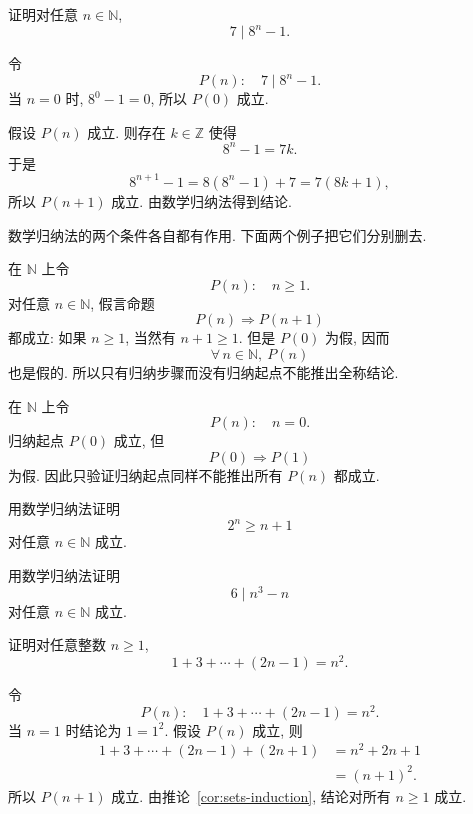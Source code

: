 \documentclass[usesamecnt, thmcnt=section, lang=cn, newtx, 10pt, scheme=chinese]{elegantbook}
\begin{document}
\begin{example}
证明对任意 $n\in\mathbb N$,
\[
 7\mid 8^n-1.
\]
\end{example}

\begin{solution}
令
\[
 P(n):\quad 7\mid 8^n-1.
\]
当 $n=0$ 时, $8^0-1=0$, 所以 $P(0)$ 成立.

假设 $P(n)$ 成立. 则存在 $k\in\mathbb Z$ 使得
\[
 8^n-1=7k.
\]
于是
\[
 8^{n+1}-1
 =8(8^n-1)+7
 =7(8k+1),
\]
所以 $P(n+1)$ 成立. 由数学归纳法得到结论.
\end{solution}

数学归纳法的两个条件各自都有作用. 下面两个例子把它们分别删去.

\begin{instance}
在 $\mathbb N$ 上令
\[
 P(n):\quad n\geq1.
\]
对任意 $n\in\mathbb N$, 假言命题
\[
 P(n)\Rightarrow P(n+1)
\]
都成立: 如果 $n\geq1$, 当然有 $n+1\geq1$. 但是 $P(0)$ 为假, 因而
\[
 \forall\,n\in\mathbb N,\ P(n)
\]
也是假的. 所以只有归纳步骤而没有归纳起点不能推出全称结论.
\end{instance}

\begin{instance}
在 $\mathbb N$ 上令
\[
 P(n):\quad n=0.
\]
归纳起点 $P(0)$ 成立, 但
\[
 P(0)\Rightarrow P(1)
\]
为假. 因此只验证归纳起点同样不能推出所有 $P(n)$ 都成立.
\end{instance}

\begin{exercise}\label{ex:sets-induction-01}
用数学归纳法证明
\[
 2^n\geq n+1
\]
对任意 $n\in\mathbb N$ 成立.
\end{exercise}

\begin{exercise}\label{ex:sets-induction-02}
用数学归纳法证明
\[
 6\mid n^3-n
\]
对任意 $n\in\mathbb N$ 成立.
\end{exercise}

\begin{example}
证明对任意整数 $n\geq1$,
\[
 1+3+\cdots+(2n-1)=n^2.
\]
\end{example}

\begin{solution}
令
\[
 P(n):\quad 1+3+\cdots+(2n-1)=n^2.
\]
当 $n=1$ 时结论为 $1=1^2$. 假设 $P(n)$ 成立, 则
\[
 \begin{aligned}
  1+3+\cdots+(2n-1)+(2n+1)
  &=n^2+2n+1\\
  &=(n+1)^2.
 \end{aligned}
\]
所以 $P(n+1)$ 成立. 由推论~\ref{cor:sets-induction}, 结论对所有 $n\geq1$ 成立.
\end{solution}
\end{document}
